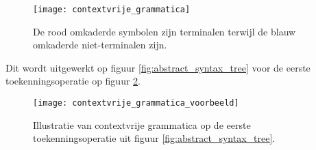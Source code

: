 \begin{figure}[h]
	\centering
	\texttt{[image: contextvrije\_grammatica]}
	\caption{De rood omkaderde symbolen zijn {\color{cvred} terminalen} terwijl de blauw omkaderde {\color{cvblue}niet-terminalen} zijn.} 
	\label{fig:contextvrije_grammatica}
\end{figure}

Dit wordt uitgewerkt op figuur \ref{fig:abstract_syntax_tree} voor de eerste toekenningsoperatie op figuur \ref{fig:contextvrije_grammatica_voorbeeld}.
\begin{figure}[h]
	\centering
	\texttt{[image: contextvrije\_grammatica\_voorbeeld]}
	\caption{Illustratie van contextvrije grammatica op de eerste toekenningsoperatie uit figuur \ref{fig:abstract_syntax_tree}.} 
	\label{fig:contextvrije_grammatica_voorbeeld}
\end{figure}

